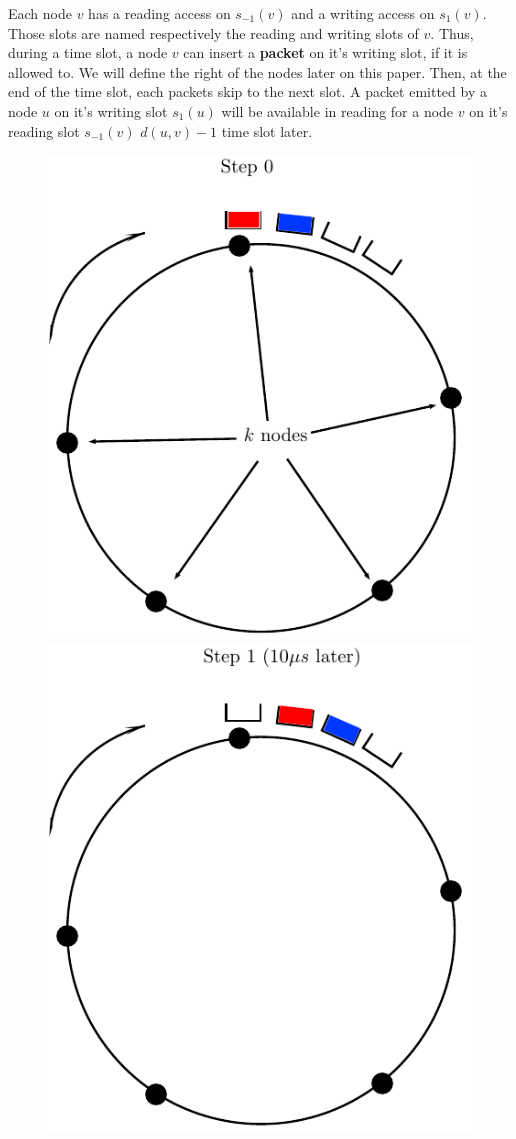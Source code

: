 \documentclass[a4paper,10pt]{article}
\begin{document}
  Each node $v$ has a reading access on $s_{-1}(v)$ and a writing access on $s_{1}(v)$. Those slots are named respectively the reading and writing slots of $v$. Thus, during a time slot, a node $v$ can insert a {\bf packet} on it's writing slot, if it is allowed to. We will define the right of the nodes later on this paper. Then, at the end of the time slot, each packets skip to the next slot. A packet emitted by a node $u$ on it's writing slot $s_1(u)$ will be available in reading for a node $v$ on it's reading slot $s_{-1}(v)$ $d(u,v) -1$  time slot later.
\begin{figure}[h!]
      \includegraphics[scale=0.5]{anneau1.pdf}
      \hspace{3cm}
      \includegraphics[scale=0.5]{anneau2.pdf}

\end{figure}
\end{document}
